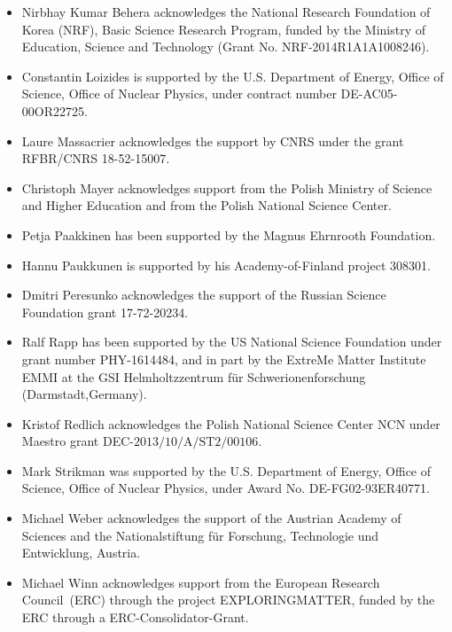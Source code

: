\begin{itemize}
\item Nirbhay Kumar Behera acknowledges the National Research Foundation of Korea (NRF), Basic Science Research Program, funded by the Ministry of Education, Science and Technology (Grant No. NRF-2014R1A1A1008246). %
\item Constantin Loizides is supported by the U.S. Department of Energy, Office of Science, Office of Nuclear Physics, under contract number DE-AC05-00OR22725.
\item Laure Massacrier acknowledges the support by CNRS under the grant RFBR/CNRS 18-52-15007.%
\item Christoph Mayer acknowledges support from the Polish Ministry of Science and Higher Education and from the Polish National Science Center.%
\item Petja Paakkinen has been supported by the Magnus Ehrnrooth Foundation.%
\item Hannu Paukkunen is supported by his Academy-of-Finland project 308301.%
\item Dmitri Peresunko acknowledges the support of the Russian Science Foundation grant 17-72-20234.%
\item Ralf Rapp has been supported by the US National Science Foundation under grant number PHY-1614484, and in part by the ExtreMe Matter Institute EMMI at the GSI Helmholtzzentrum f\"{u}r Schwerionenforschung (Darmstadt,Germany).%
\item Kristof Redlich acknowledges the Polish National Science Center NCN under Maestro grant DEC-$\mathrm{2013/10/A/ST2/00106}$.  %
\item Mark Strikman was supported by the U.S. Department of Energy, Office of Science, Office of Nuclear Physics, under Award No. DE-FG02-93ER40771.%
\item Michael Weber acknowledges the support of the Austrian Academy of Sciences and the Nationalstiftung f\"ur Forschung, Technologie und Entwicklung, Austria.%
\item Michael Winn acknowledges support from the European Research Council~(ERC) through the project EXPLORINGMATTER, funded by the ERC through a ERC-Consolidator-Grant.%

\end{itemize}
